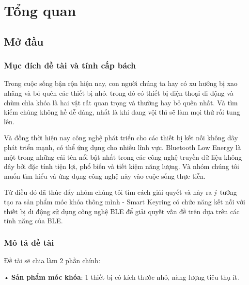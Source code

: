 
\chapter{Tổng quan}  %

\ifpdf
    \graphicspath{{Chapter1/Figs/Raster/}{Chapter1/Figs/PDF/}{Chapter1/Figs/}{}}
\else
    \graphicspath{{Chapter1/Figs/Vector/}{Chapter1/Figs/}}
\fi


\section{Mở đầu} %
\subsection{Mục đích đề tài và tính cấp bách}
Trong cuộc sống bận rộn hiện nay, con người chúng ta hay có xu hướng bị xao nhãng và bỏ quên các thiết bị nhỏ. trong đó có thiết bị điện thoại di động và chùm chìa khóa là hai vật rất quan trọng và thường hay bỏ quên nhất. Và tìm kiếm chúng không hề dễ dàng, nhất là khi đang vội thì sẽ làm mọi thứ rối tung lên.

Và đồng thời hiện nay công nghệ phát triển cho các thiết bị kết nối không dây phát triển mạnh, có thể ứng dụng cho nhiều lĩnh vực. Bluetooth Low Energy là một trong những cái tên nổi bật nhất trong các công nghệ truyền dữ liệu không dây bởi đặc tính tiện lợi, phổ biến và tiết kiệm năng lượng. Và nhóm chúng tôi muốn tìm hiểu và ứng dụng công nghệ này vào cuộc sống thực tiễn.

Từ điều đó đã thúc đẩy nhóm chúng tôi tìm cách giải quyết và nảy ra ý tưởng tạo ra sản phẩm móc khóa thông mình - Smart Keyring có chức năng kết nối với thiết bị di động sử dụng công nghệ BLE để giải quyết vấn đề trên dựa trên các tính năng của BLE.
\subsection{Mô tả đề tài}

Đề tài sẽ chia làm 2 phần chính:

• \textbf{Sản phẩm móc khóa}: 1 thiết bị có kích thước nhỏ, năng lượng tiêu thụ ít. 

